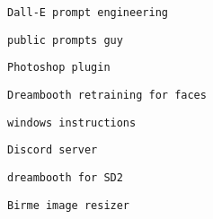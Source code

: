 \begin{verbatim}
Dall-E prompt engineering
\end{verbatim}
               

               
               
                \protect\hypertarget{ID_504958492}{}{}

\begin{verbatim}
public prompts guy
\end{verbatim}
               
             

             
             
              \protect\hypertarget{ID_384400872}{}{}

\begin{verbatim}
Photoshop plugin
\end{verbatim}
             

             
             
              \protect\hypertarget{ID_1058153455}{}{}

\begin{verbatim}
Dreambooth retraining for faces
\end{verbatim}

               
               
                \protect\hypertarget{ID_101382993}{}{}

\begin{verbatim}
windows instructions
\end{verbatim}
               

               
               
                \protect\hypertarget{ID_813866246}{}{}

\begin{verbatim}
Discord server
\end{verbatim}
               

               
               
                \protect\hypertarget{ID_287920096}{}{}

\begin{verbatim}
dreambooth for SD2
\end{verbatim}
               

               
               
                \protect\hypertarget{ID_242280887}{}{}

\begin{verbatim}
Birme image resizer
\end{verbatim}
               

